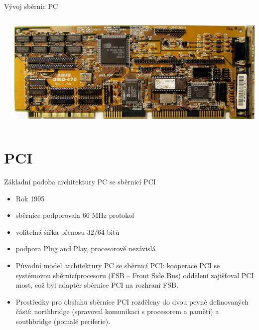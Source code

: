 \documentclass[aspectratio=43]{beamer}
\begin{document}
\begin{frame}{Vývoj sběrnic PC}
\begin{columns}
\begin{itemize}
		\end{itemize}
        \vspace{0.5}
		\includegraphics[width=1\linewidth]{extrahovane_obrazky/img_1_page9_7.jpeg}
	\end{columns}
	
\end{frame}

\section{PCI}
\begin{frame}{Základní podoba architektury PC se sběrnicí PCI}
	\begin{itemize}
        \item Rok 1995
        \item sběrnice podporovala 66 MHz protokol
        \item volitelná šířka přenosu 32/64 bitů
        \item podpora Plug and Play, procesorově nezávislá
        \item Původní model architektury PC se sběrnicí PCI: kooperace PCI se systémovou sběrnicíprocesoru (FSB – Front Side Bus) oddělení zajišťoval PCI most, což byl adaptér sběrnice PCI na rozhraní FSB.
        \item Prostředky pro obsluhu sběrnice PCI rozděleny do dvou pevně definovaných částí: northbridge (spravoval komunikaci s procesorem a pamětí) a southbridge (pomalé periferie).
    \end{itemize}
	
\end{frame}
\end{document}
